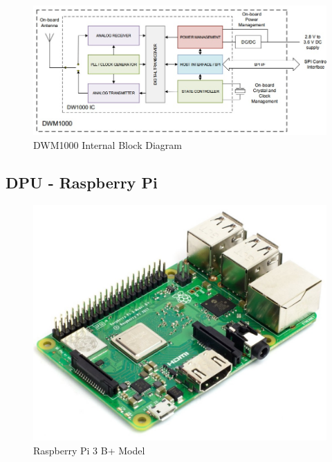 \medskip
\begin{figure}[H]
\centering
    \includegraphics[scale=0.7]{./images/dwm1000_bd.jpg}
    \caption{DWM1000 Internal Block Diagram}
    \label{dwm1000_bd}
\end{figure}




\pagebreak
\subsection{DPU - Raspberry Pi}


\medskip
\begin{figure}[H]
\centering
    \includegraphics[scale=1]{./images/pi.jpg}
    \caption{Raspberry Pi 3 B+ Model}
    \label{pi}
\end{figure}





